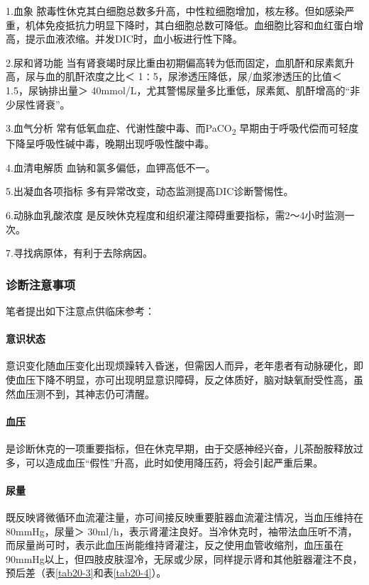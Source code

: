 1.血象
脓毒性休克其白细胞总数多升高，中性粒细胞增加，核左移。但如感染严重，机体免疫抵抗力明显下降时，其白细胞总数可降低。血细胞比容和血红蛋白增高，提示血液浓缩。并发DIC时，血小板进行性下降。

2.尿和肾功能
当有肾衰竭时尿比重由初期偏高转为低而固定，血肌酐和尿素氮升高，尿与血的肌酐浓度之比＜
1∶5，尿渗透压降低，尿/血浆渗透压的比值＜ 1.5，尿钠排出量＞
40mmol/L，尤其警惕尿量多比重低，尿素氮、肌酐增高的“非少尿性肾衰”。

3.血气分析 常有低氧血症、代谢性酸中毒、而PaCO\textsubscript{2}
早期由于呼吸代偿而可轻度下降呈呼吸性碱中毒，晚期出现呼吸性酸中毒。

4.血清电解质 血钠和氯多偏低，血钾高低不一。

5.出凝血各项指标 多有异常改变，动态监测提高DIC诊断警惕性。

6.动脉血乳酸浓度
是反映休克程度和组织灌注障碍重要指标，需2～4小时监测一次。

7.寻找病原体，有利于去除病因。

\subsubsection{诊断注意事项}

笔者提出如下注意点供临床参考：

\paragraph{意识状态}

意识变化随血压变化出现烦躁转入昏迷，但需因人而异，老年患者有动脉硬化，即使血压下降不明显，亦可出现明显意识障碍，反之体质好，脑对缺氧耐受性高，虽然血压测不到，其神志仍可清醒。

\paragraph{血压}

是诊断休克的一项重要指标，但在休克早期，由于交感神经兴奋，儿茶酚胺释放过多，可以造成血压“假性”升高，此时如使用降压药，将会引起严重后果。

\paragraph{尿量}

既反映肾微循环血流灌注量，亦可间接反映重要脏器血流灌注情况，当血压维持在80mmHg，尿量＞
30ml/h，表示肾灌注良好。当冷休克时，袖带法血压听不清，而尿量尚可时，表示此血压尚能维持肾灌注，反之使用血管收缩剂，血压虽在90mmHg以上，但四肢皮肤湿冷，无尿或少尿，同样提示肾和其他脏器灌注不良，预后差（表\ref{tab20-3}和表\ref{tab20-4}）。

